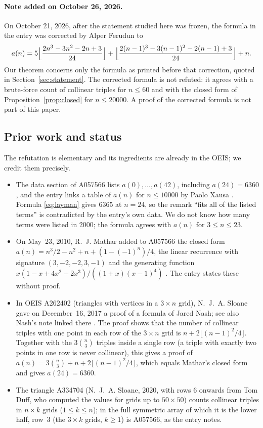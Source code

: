 \documentclass[11pt]{amsart}
\theoremstyle{plain}
\theoremstyle{definition}
\begin{document}
\paragraph{Note added on October 26, 2026.} On October 21, 2026, after the statement studied here was frozen, the formula in the entry was corrected by Alper Ferudun to
\[
  a(n)=5\Bigl\lfloor\frac{2n^3-3n^2-2n+3}{24}\Bigr\rfloor+\Bigl\lfloor\frac{2(n-1)^3-3(n-1)^2-2(n-1)+3}{24}\Bigr\rfloor+n .
\]
Our theorem concerns only the formula as printed before that correction, quoted in Section~\ref{sec:statement}. The corrected formula is not refuted: it agrees with a brute-force count of collinear triples for $n\le 60$ and with the closed form of Proposition~\ref{prop:closed} for $n\le 20000$. A proof of the corrected formula is not part of this paper.

\subsection*{Prior work and status}
The refutation is elementary and its ingredients are already in the OEIS; we credit them precisely.
\begin{itemize}
\item The data section of A057566 lists $a(0),\dots,a(42)$, including $a(24)=6360$, and the entry links a table of $a(n)$ for $n\le10000$ by Paolo Xausa \cite{A057566}. Formula \eqref{eq:layman} gives $6365$ at $n=24$, so the remark ``fits all of the listed terms'' is contradicted by the entry's own data. We do not know how many terms were listed in 2000; the formula agrees with $a(n)$ for $3\le n\le 23$.
\item On May~23, 2010, R.~J. Mathar added to A057566 the closed form $a(n)=n^3/2-n^2+n+(1-(-1)^n)/4$, the linear recurrence with signature $(3,-2,-2,3,-1)$ and the generating function $x(1-x+4x^2+2x^3)/((1+x)(x-1)^4)$ \cite{A057566}. The entry states these without proof.
\item In OEIS A262402 \cite{A262402} (triangles with vertices in a $3\times n$ grid), N.~J.~A. Sloane gave on December~16, 2017 a proof of a formula of Jared Nash; see also Nash's note linked there \cite{Nash}. The proof shows that the number of collinear triples with one point in each row of the $3\times n$ grid is $n+2\lfloor(n-1)^2/4\rfloor$. Together with the $3\binom n3$ triples inside a single row (a triple with exactly two points in one row is never collinear), this gives a proof of $a(n)=3\binom n3+n+2\lfloor(n-1)^2/4\rfloor$, which equals Mathar's closed form and gives $a(24)=6360$.
\item The triangle A334704 \cite{A334704} (N.~J.~A. Sloane, 2020, with rows $6$ onwards from Tom Duff, who computed the values for grids up to $50\times50$) counts collinear triples in $n\times k$ grids ($1\le k\le n$); in the full symmetric array of which it is the lower half, row~$3$ (the $3\times k$ grids, $k\ge1$) is A057566, as the entry notes.
\end{itemize}
\end{document}
